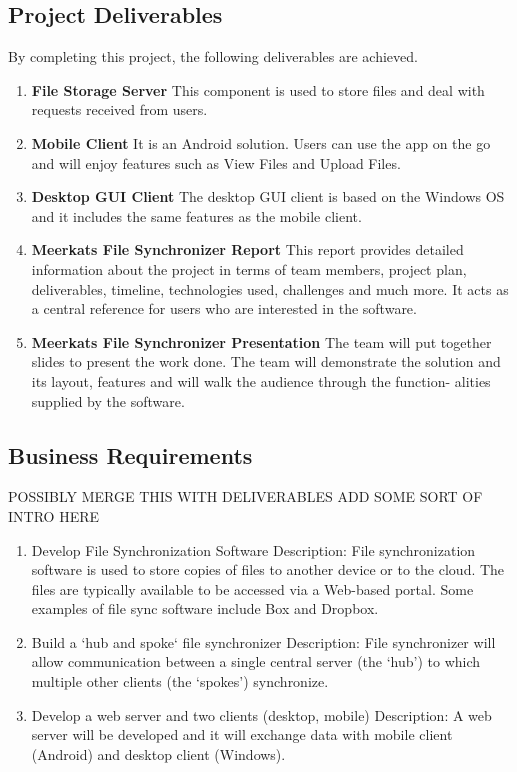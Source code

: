 \documentclass{article}
\begin{document}
\subsection{Project Deliverables}
By completing this project, the following deliverables are achieved.
\begin{enumerate}
  \item \textbf{File Storage Server} This component is used to store files and deal with requests received from users.
  \item \textbf{Mobile Client} It is an Android solution. Users can use the app on the go and will enjoy features such as View Files and Upload Files.
  \item \textbf{Desktop GUI Client} The desktop GUI client is based on the Windows OS and it includes the same features as the mobile client.
  \item \textbf{Meerkats File Synchronizer Report} This report provides detailed information about the project in terms of team members, project plan, deliverables, timeline, technologies used, challenges and much more. It acts as a central reference for users who are interested in the software.
  \item \textbf{Meerkats File Synchronizer Presentation} The team will put together slides to present the work done. The team will demonstrate the solution and its layout, features and will walk the audience through the function- alities supplied by the software.
\end{enumerate}


\subsection{Business Requirements}
POSSIBLY MERGE THIS WITH DELIVERABLES
ADD SOME SORT OF INTRO HERE
\begin{enumerate}
  \item Develop File Synchronization Software
  Description:  File synchronization software is used to store copies of files to another device or to the cloud. The files are typically available to be accessed via a Web-based portal. Some examples of file sync software include Box and Dropbox.
  \item Build a ‘hub and spoke‘ file synchronizer
  Description: File synchronizer will allow communication between a single central server (the ‘hub’) to which multiple other clients (the ‘spokes’) synchronize.
  \item Develop a web server and two clients (desktop, mobile)
  Description: A web server will be developed and it will exchange data with mobile client (Android) and desktop client (Windows).
\end{enumerate}
\end{document}
